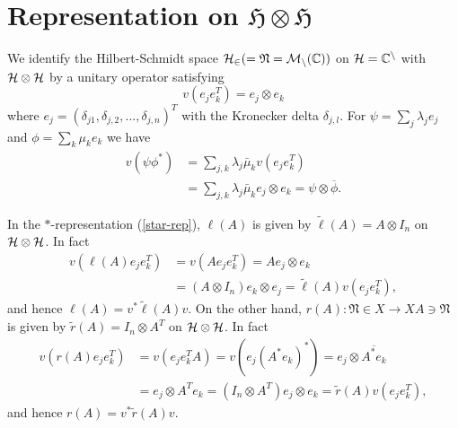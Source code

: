 \section{Representation on $\mathfrak{H}\otimes\mathfrak{H}$}

 We identify the Hilbert-Schmidt space $\cal{H}_2(=\mathfrak{N}=M_n(\mathbb{C}))$ on $\cal{H}=\mathbb{C}^n$ with $\cal{H}\otimes\cal{H}$
by a unitary operator satisfying 
$$
v(e_je_k^T)=e_j\otimes e_k
$$
where $e_j=(\delta_{j1},\delta_{j,2},...,\delta_{j,n})^T$ with the Kronecker delta $\delta_{j,l}$. 
For $\psi=\sum_j \lambda_j e_j$ and $\phi=\sum_k \mu_k e_k$
we have
\begin{equation}
\begin{split}
v(\psi\phi^\ast)&=\sum_{j,k}\lambda_j\bar{\mu}_k v(e_je_k^T)\\
&=\sum_{j,k}\lambda_j\bar{\mu}_k e_j\otimes e_k={\psi}\otimes \overline{\phi}.
\end{split}
\end{equation}

In the $\ast$-representation (\ref{star-rep}), $\ell(A)$ is given by $\tilde{\ell}(A)=A\otimes I_n$ on $\cal{H}\otimes\cal{H}$.
In fact
 \begin{equation}
 \begin{split}
 v(\ell(A)e_je_k^T)&=v(Ae_je_k^T)=Ae_j\otimes e_k\\
 &= (A\otimes I_n)e_k\otimes  e_j=\tilde{\ell}(A)v(e_je_k^T),
 \end{split} 
 \end{equation}
 and hence $\ell(A)=v^{\ast}\tilde{\ell}(A)v$. 
On the other hand, $r(A):\mathfrak{N}\in X \to XA\ni\mathfrak{N}$ is 
given by $\tilde{r}(A)=I_n\otimes A^T$ on $\cal{H}\otimes\cal{H}$.
In fact
 \begin{equation}
 \begin{split}
 v(r(A)e_je_k^T)&=v(e_je_k^TA)=v(e_j(A^\ast e_k)^\ast)=e_j\otimes \overline{A^\ast e_k}\\
 &= e_j \otimes A^T e_k= (I_n\otimes A^T)e_j\otimes  e_k=\tilde{r}(A)v(e_je_k^T),
 \end{split} 
 \end{equation}
 and hence $r(A)=v^{\ast}\tilde{r}(A) v$. 
